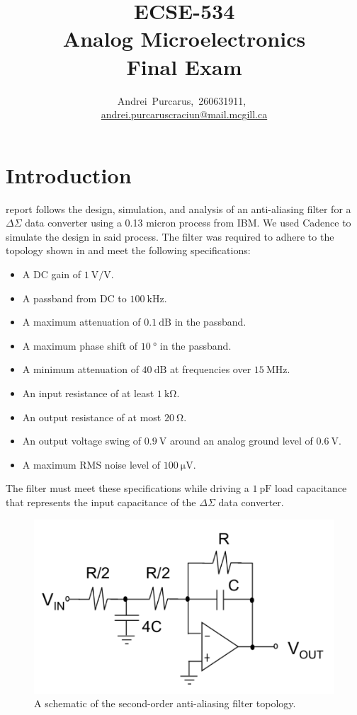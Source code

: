 \documentclass[journal,hidelinks]{IEEEtran}
\title{ECSE-534 \\ Analog Microelectronics \\ Final Exam}
\author{Andrei~Purcarus,~260631911,~\IEEEmembership{McGill~University} \\ \href{mailto:andrei.purcaruscraciun@mail.mcgill.ca}{andrei.purcaruscraciun@mail.mcgill.ca}}
\begin{document}
\sloppy

\maketitle

\section{Introduction}

 report follows the design, simulation, and analysis of an anti-aliasing filter for a $\Delta \Sigma$ data converter using a 0.13 micron process from IBM. We used Cadence to simulate the design in said process. The filter was required to adhere to the topology shown in  and meet the following specifications:
\begin{itemize}
  \item A DC gain of $\SI{1}{\volt\per\volt}$.
  \item A passband from DC to $\SI{100}{\kilo\hertz}$.
  \item A maximum attenuation of $\SI{0.1}{\deci\bel}$ in the passband.
  \item A maximum phase shift of $\SI{10}{\degree}$ in the passband.
  \item A minimum attenuation of $\SI{40}{\deci\bel}$ at frequencies over $\SI{15}{\mega\hertz}$.
  \item An input resistance of at least $\SI{1}{\kilo\ohm}$.
  \item An output resistance of at most $\SI{20}{\ohm}$.
  \item An output voltage swing of $\SI{0.9}{\volt}$ around an analog ground level of $\SI{0.6}{\volt}$.
  \item A maximum RMS noise level of $\SI{100}{\micro\volt}$.
\end{itemize}

The filter must meet these specifications while driving a $\SI{1}{\pico\farad}$ load capacitance that represents the input capacitance of the $\Delta \Sigma$ data converter.

\begin{figure}[!htb]
  \centering
  \includegraphics[width=\columnwidth]{schematics/filter_topology.png}
  \caption{A schematic of the second-order anti-aliasing filter topology.}
  \label{fig:filter_topology}
\end{figure}
\end{document}
